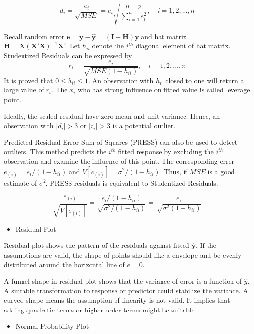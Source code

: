 \documentclass[
  11pt,
  openany]{memoir}
\providecommand{\tightlist}{%
  \setlength{\itemsep}{0pt}\setlength{\parskip}{0pt}}
\begin{document}
\[d_i=\frac{e_i}{\sqrt{MSE}}=e_i\sqrt{\frac{n-p}{\sum_{i=1}^n e_i^2}},\quad i=1,2,...,n\]

Recall random error \(\mathbf{e}=\mathbf{y}-\mathbf{\hat y}=(\mathbf{I}-\mathbf{H})\mathbf{y}\) and hat matrix \(\mathbf{H}=\mathbf{X}(\mathbf{X'X})^{-1}\mathbf{X'}\).
Let \(h_{ii}\) denote the \(i^{th}\) diagonal element of hat matrix.
Studentized Residuals can be expressed by
\[r_i=\frac{e_i}{\sqrt{MSE(1-h_{ii})}},\quad i=1,2,...,n\]
It is proved that \(0\le h_{ii}\le1\).
An observation with \(h_{ii}\) closed to one will return a large value of \(r_i\). The \(x_i\) who has strong influence on fitted value is called leverage point.

Ideally, the scaled residual have zero mean and unit variance. Hence, an observation with \(|d_i|>3\) or \(|r_i|>3\) is a potential outlier.

Predicted Residual Error Sum of Squares (PRESS) can also be used to detect outliers.
This method predicts the \(i^{th}\) fitted response by excluding the \(i^{th}\) observation and examine the influence of this point.
The corresponding error \(e_{(i)}=e_{i}/(1-h_{ii})\) and \(V[e_{(i)}]=\sigma^2/(1-h_{ii})\).
Thus, if \(MSE\) is a good estimate of \(\sigma^2\), PRESS residuals is equivalent to Studentized Residuals.

\[\frac{e_{(i)}}{\sqrt{V[e_{(i)}]}}=\frac{e_i/(1-h_{ii})}{\sqrt{\sigma^2/(1-h_{ii})}}=\frac{e_i}{\sqrt{\sigma^2(1-h_{ii})}}\]

\begin{itemize}
\tightlist
\item
  Residual Plot
\end{itemize}

Residual plot shows the pattern of the residuals against fitted \(\mathbf{\hat y}\).
If the assumptions are valid, the shape of points should like a envelope and be evenly distributed around the horizontal line of \(e=0\).

A funnel shape in residual plot shows that the variance of error is a function of \(\hat y\). A suitable transformation to response or predictor could stabilize the variance.
A curved shape means the assumption of linearity is not valid. It implies that adding quadratic terms or higher-order terms might be suitable.

\begin{itemize}
\tightlist
\item
  Normal Probability Plot
\end{itemize}
\end{document}
